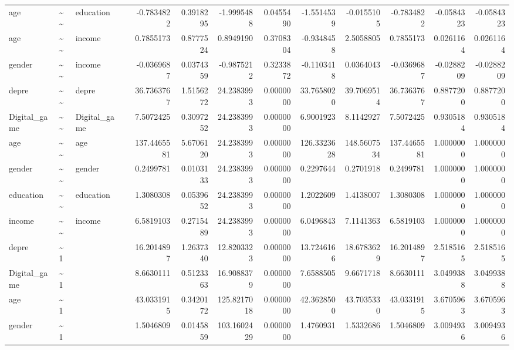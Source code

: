 \documentclass[
]{article}
\begin{document}
\begin{table}[!h]
\begin{tabular}[t]{llllrrrrrrrrr}
age & \textasciitilde{}\textasciitilde{} & education &  & -0.7834822 & 0.3918295 & -1.9995488 & 0.0455490 & -1.5514539 & -0.0155105 & -0.7834822 & -0.0584323 & -0.0584323\\
age & \textasciitilde{}\textasciitilde{} & income &  & 0.7855173 & 0.8777524 & 0.8949190 & 0.3708304 & -0.9348458 & 2.5058805 & 0.7855173 & 0.0261164 & 0.0261164\\
gender & \textasciitilde{}\textasciitilde{} & income &  & -0.0369687 & 0.0374359 & -0.9875212 & 0.3233872 & -0.1103418 & 0.0364043 & -0.0369687 & -0.0288209 & -0.0288209\\
\addlinespace
depre & \textasciitilde{}\textasciitilde{} & depre &  & 36.7363767 & 1.5156272 & 24.2383993 & 0.0000000 & 33.7658020 & 39.7069514 & 36.7363767 & 0.8877200 & 0.8877200\\
Digital\_game & \textasciitilde{}\textasciitilde{} & Digital\_game &  & 7.5072425 & 0.3097252 & 24.2383993 & 0.0000000 & 6.9001923 & 8.1142927 & 7.5072425 & 0.9305184 & 0.9305184\\
age & \textasciitilde{}\textasciitilde{} & age &  & 137.4465581 & 5.6706120 & 24.2383993 & 0.0000000 & 126.3323628 & 148.5607534 & 137.4465581 & 1.0000000 & 1.0000000\\
gender & \textasciitilde{}\textasciitilde{} & gender &  & 0.2499781 & 0.0103133 & 24.2383993 & 0.0000000 & 0.2297644 & 0.2701918 & 0.2499781 & 1.0000000 & 1.0000000\\
education & \textasciitilde{}\textasciitilde{} & education &  & 1.3080308 & 0.0539652 & 24.2383993 & 0.0000000 & 1.2022609 & 1.4138007 & 1.3080308 & 1.0000000 & 1.0000000\\
\addlinespace
income & \textasciitilde{}\textasciitilde{} & income &  & 6.5819103 & 0.2715489 & 24.2383993 & 0.0000000 & 6.0496843 & 7.1141363 & 6.5819103 & 1.0000000 & 1.0000000\\
depre & \textasciitilde{}1 &  &  & 16.2014897 & 1.2637340 & 12.8203323 & 0.0000000 & 13.7246166 & 18.6783629 & 16.2014897 & 2.5185165 & 2.5185165\\
Digital\_game & \textasciitilde{}1 &  &  & 8.6630111 & 0.5123363 & 16.9088379 & 0.0000000 & 7.6588505 & 9.6671718 & 8.6630111 & 3.0499388 & 3.0499388\\
age & \textasciitilde{}1 &  &  & 43.0331915 & 0.3420172 & 125.8217018 & 0.0000000 & 42.3628500 & 43.7035330 & 43.0331915 & 3.6705963 & 3.6705963\\
gender & \textasciitilde{}1 &  &  & 1.5046809 & 0.0145859 & 103.1602429 & 0.0000000 & 1.4760931 & 1.5332686 & 1.5046809 & 3.0094936 & 3.0094936\\

\end{tabular}
\end{table}
\end{document}
